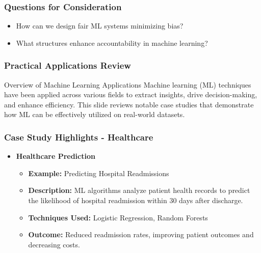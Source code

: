 \documentclass[aspectratio=169]{beamer}
\begin{document}
\begin{frame}[fragile]
    \frametitle{Questions for Consideration}
    \begin{itemize}
        \item How can we design fair ML systems minimizing bias?
        \item What structures enhance accountability in machine learning?
    \end{itemize}
\end{frame}

\begin{frame}[fragile]
    \frametitle{Practical Applications Review}
    \begin{block}{Overview of Machine Learning Applications}
        Machine learning (ML) techniques have been applied across various fields to extract insights, drive decision-making, and enhance efficiency. This slide reviews notable case studies that demonstrate how ML can be effectively utilized on real-world datasets.
    \end{block}
\end{frame}

\begin{frame}[fragile]
    \frametitle{Case Study Highlights - Healthcare}
    \begin{itemize}
        \item \textbf{Healthcare Prediction}
        \begin{itemize}
            \item \textbf{Example:} Predicting Hospital Readmissions
            \item \textbf{Description:} ML algorithms analyze patient health records to predict the likelihood of hospital readmission within 30 days after discharge.
            \item \textbf{Techniques Used:} Logistic Regression, Random Forests
            \item \textbf{Outcome:} Reduced readmission rates, improving patient outcomes and decreasing costs.
        \end{itemize}
    \end{itemize}
\end{frame}
\end{document}
